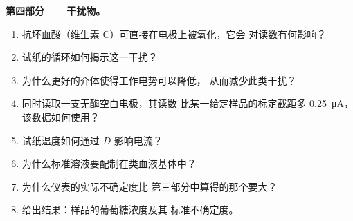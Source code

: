 \begin{problem}
\medskip\noindent\textbf{第四部分——干扰物。}
\begin{enumerate}[resume]
  \item 抗坏血酸（维生素 C）可直接在电极上被氧化，它会
        对读数有何影响？
  \item 试纸的循环如何揭示这一干扰？
  \item 为什么更好的介体使得工作电势可以降低，
        从而减少此类干扰？
  \item 同时读取一支无酶空白电极，其读数
        比某一给定样品的标定截距多 \qty{0.25}{\micro A}，
        该数据如何使用？
  \item 试纸温度如何通过 $D$ 影响电流？
  \item 为什么标准溶液要配制在类血液基体中？
  \item 为什么仪表的实际不确定度比
        第三部分中算得的那个要大？
  \item 给出结果：样品的葡萄糖浓度及其
        标准不确定度。
\end{enumerate}
\end{problem}
